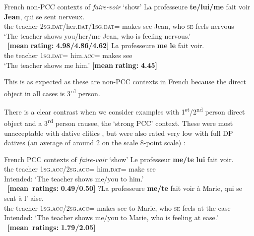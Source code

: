\documentclass[output=paper,colorlinks,citecolor=brown,nonflat]{./langscibook}
\begin{document}
\ea%
    \label{ex:sheehan:24}
    French non-PCC contexts of \textit{faire-voir} ‘show’
    \ea\label{ex:sheehan:24a}
    \gll    La professeure \textbf{te/lui/me}  fait voir \textbf{Jean},  qui   se   sent   nerveux.\\
            the   teacher   2\textsc{sg}.\textsc{dat}/her.\textsc{dat}/\textsc{1sg}.\textsc{dat}= makes see   Jean,   who \textsc{se}   feels   nervous\\
    \glt    ‘The teacher shows you/her/me Jean, who is feeling nervous.’\\
            ~\hfill \textbf{[mean} \textbf{rating:} \textbf{4.98/4.86/4.62]}
    \ex\label{ex:sheehan:24b}
    \gll    La   professeure   \textbf{me}   \textbf{le}  fait  voir.\\
            the   teacher  \textsc{1sg}.\textsc{dat=} him.\textsc{acc=}  makes  see\\
    \glt     ‘The teacher shows me him.’ \hfill  \textbf{[mean} \textbf{rating:} \textbf{4.45]}
    \z
\z

This is as expected as these are non-PCC contexts in French because the direct object in all cases is 3\textsuperscript{rd} person. 

There is a clear contrast when we consider examples with 1\textsuperscript{st}/2\textsuperscript{nd} person direct object and a 3\textsuperscript{rd} person causee, the ‘strong PCC’ context. These were most unacceptable with dative clitics , but were also rated very low with full DP datives (an average of around 2 on the scale 8-point scale) :

\ea%
    \label{ex:sheehan:25}
    French PCC contexts of \textit{faire-voir} ‘show’
    \ea\label{ex:sheehan:25a}
    \gll    *Le professeur  \textbf{me/te}       \textbf{lui}   fait   voir.\\
            the   teacher  \textsc{1sg}.\textsc{acc/}2\textsc{sg}.\textsc{acc}=  him.\textsc{dat}=  make see\\
    \glt    Intended: ‘The teacher shows me/you to him.’\\
            ~\hfill \textbf{[mean~ratings:} \textbf{0.49/0.50]}
    \ex\label{ex:sheehan:25b}
    \gll    *?La   professeure   \textbf{me/te}       fait     voir à   Marie,  qui   se  sent   à   l’  aise. \\
            the     teacher     \textsc{1sg}.\textsc{acc/}2\textsc{sg}.\textsc{acc}= makes   see to Marie, who \textsc{se}   feels   at   the ease\\
    \glt    Intended: ‘The teacher shows me/you to Marie, who is feeling at ease.’%
            ~\hfill \textbf{[mean~ratings:} \textbf{1.79/2.05]}
    \z
\z
\end{document}
